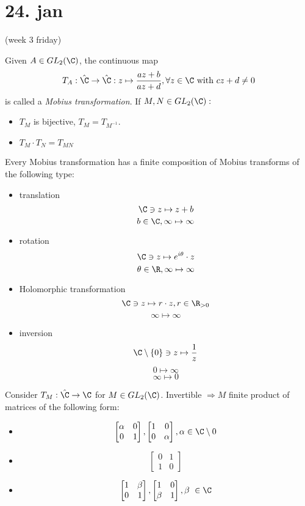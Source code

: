 \section{24. jan}(week 3 friday)
\begin{recall}
  Given $A\in GL_2(\C)$, the continuous map
    $$T_A: \hat{\C}\to \hat{\C}: z\mapsto\frac{az+b}{az+d}, \forall z\in \C \text{ with }cz+d\neq 0$$
  is called a \emph{Mobius transformation}. If $M,N\in GL_2(\C):$
    \begin{itemize}
      \item $T_M$ is bijective, $T_M=T_{M^{-1}}$.
      \item $T_M\cdot T_N=T_{MN}$
    \end{itemize}
\end{recall}

\begin{remark}
  Every Mobius transformation has a finite composition of Mobius transforms of the following type:
    \begin{itemize}
      \item translation
        $$\C \ni z\mapsto z+b$$
        $$b\in \C, \infty \mapsto \infty$$
      \item rotation
        $$\C \ni z\mapsto e^{i\theta} \cdot z$$
        $$\theta \in \R, \infty \mapsto \infty$$
      \item Holomorphic transformation
        $$\C \ni z\mapsto r \cdot z, r\in \R_{>0}$$
        $$\infty \mapsto \infty$$
      \item inversion
        $$\C\setminus\{0\}\ni z \mapsto \frac{1}{z}$$
        $$0\mapsto \infty$$
        $$\infty \mapsto 0$$
    \end{itemize}
\end{remark}
Consider $T_M:\hat{\C}\to \C$ for $M\in GL_2(\C)$.
\newline Invertible $\Rightarrow M$ finite product of matrices of the following form:
  \begin{itemize}
    \item
    $$
    \begin{bmatrix}
        \alpha & 0 \\
        0 & 1
    \end{bmatrix},
    \begin{bmatrix}
        1 & 0 \\
        0 & \alpha
    \end{bmatrix},
    \alpha \in \C\setminus{0}
    $$
    \item
    $$
    \begin{bmatrix}
        0 & 1 \\
        1 & 0
    \end{bmatrix}
    $$
    \item
    $$
    \begin{bmatrix}
      1 & \beta \\
      0 & 1
    \end{bmatrix},
    \begin{bmatrix}
      1 & 0 \\
      \beta & 1
    \end{bmatrix}
    , \beta \in \C
    $$
  \end{itemize}

